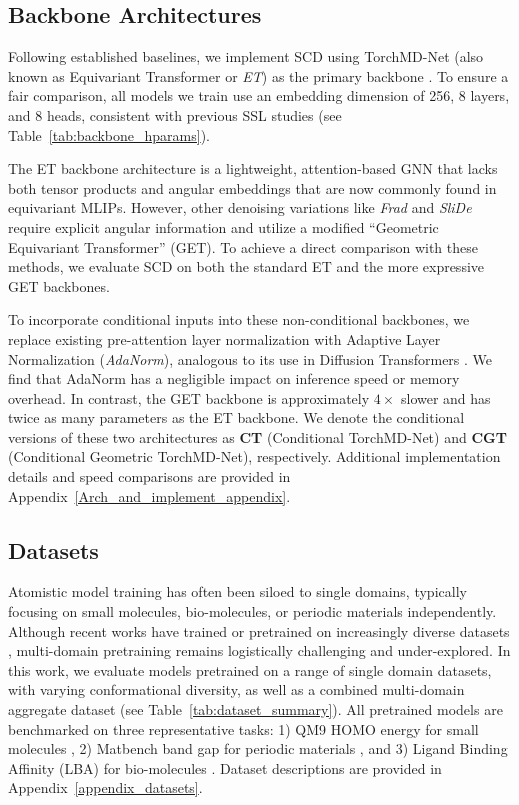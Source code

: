 \documentclass{article}
\theoremstyle{plain}
\theoremstyle{definition}
\theoremstyle{remark}
\begin{document}
\subsection{Backbone Architectures}
Following established baselines, we implement SCD using TorchMD-Net (also known as Equivariant Transformer or \textit{ET}) as the primary backbone \cite{TorchMD-Net_thölke2022, Frad_Ni2024, SliDe_Ni2025, UniCorn_Feng2024, NoisyNodes_Zaidi2023PVD}. To ensure a fair comparison, all models we train use an embedding dimension of 256, 8 layers, and 8 heads, consistent with previous SSL studies (see Table~\ref{tab:backbone_hparams}). 

The ET backbone architecture is a lightweight, attention-based GNN that lacks both tensor products and angular embeddings that are now commonly found in equivariant MLIPs. However, other denoising variations like \textit{Frad} \cite{Frad_Ni2024} and \textit{SliDe} \cite{SliDe_Ni2025} require explicit angular information and utilize a modified ``Geometric Equivariant Transformer'' (GET). To achieve a direct comparison with these methods, we evaluate SCD on both the standard ET and the more expressive GET backbones.

To incorporate conditional inputs into these non-conditional backbones, we replace existing pre-attention layer normalization with Adaptive Layer Normalization (\textit{AdaNorm}), analogous to its use in Diffusion Transformers \cite{DiT_peebles2023}. We find that AdaNorm has a negligible impact on inference speed or memory overhead. In contrast, the GET backbone is approximately $4\times$ slower and has twice as many parameters as the ET backbone. We denote the conditional versions of these two architectures as \textbf{CT} (Conditional TorchMD-Net) and \textbf{CGT} (Conditional Geometric TorchMD-Net), respectively. Additional implementation details and speed comparisons are provided in Appendix~\ref{Arch_and_implement_appendix}.

\subsection{Datasets}
Atomistic model training has often been siloed to single domains, typically focusing on small molecules, bio-molecules, or periodic materials independently. Although recent works have trained or pretrained on increasingly diverse datasets \cite{Atomica_Fang2025, ADIT_joshi2025, JMP_Shoghi2023}, multi-domain pretraining remains logistically challenging and under-explored. In this work, we evaluate models pretrained on a range of single domain datasets, with varying conformational diversity, as well as a combined multi-domain aggregate dataset (see Table~\ref{tab:dataset_summary}). All pretrained models are benchmarked on three representative tasks: 1) QM9 HOMO energy for small molecules \cite{QM9_Ramakrishnan2014}, 2) Matbench band gap for periodic materials \cite{matbench_2020}, and 3) Ligand Binding Affinity (LBA) for bio-molecules \cite{LBA_dataset}. Dataset descriptions are provided in Appendix~\ref{appendix_datasets}.
\end{document}
